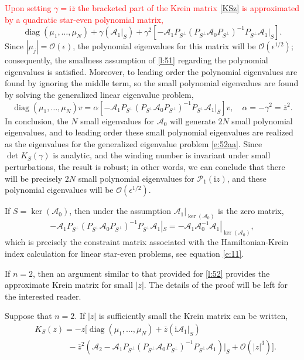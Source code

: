 \documentclass[review,onefignum,onetabnum]{siamart171218}
\def\det{\mathop\mathrm{det}\nolimits}
\def\diag{\mathop\mathrm{diag}\nolimits}
\def\ker{\mathop\mathrm{ker}\nolimits}
\newcommand{\rmi}{\mathrm{i}}
\newcommand{\calA}{\mathcal{A}}
\newcommand{\calO}{\mathcal{O}}
\newcommand{\calP}{\mathcal{P}}
\newcommand{\vK}{\bm{\mathit{K}}}
\newcommand{\vv}{\bm{\mathit{v}}}
\newcommand{\revised}[1]{ \textcolor{red}{#1} }
\begin{document}
\revised{
Upon setting $\gamma=\rmi\overline{z}$ the bracketed part of the Krein matrix \cref{KSz} is approximated by a quadratic star-even polynomial matrix,
}
\[
\diag(\mu_1,\dots,\mu_N)+\gamma\left(\calA_1|_S\right)+
\gamma^2
\left[-\calA_1P_{S^\perp}\left(P_{S^\perp}\calA_0P_{S^\perp}\right)^{-1}P_{S^\perp}\calA_1|_S\right].
\]
Since $|\mu_j|=\calO(\epsilon)$, the polynomial eigenvalues for this matrix will be $\calO(\epsilon^{1/2})$; consequently, the smallness assumption of \cref{l:51} regarding the polynomial eigenvalues is satisfied. Moreover, to leading order the polynomial eigenvalues are found by ignoring the middle term, so the small polynomial eigenvalues are found by solving the generalized linear eigenvalue problem,
\begin{equation}\label{e:52aa}
\diag(\mu_1,\dots,\mu_N)\vv=\alpha
\left[-\calA_1P_{S^\perp}\left(P_{S^\perp}\calA_0P_{S^\perp}\right)^{-1}P_{S^\perp}\calA_1|_S\right]\vv,\quad
\alpha=-\gamma^2=\overline{z}^2.
\end{equation}
In conclusion, the $N$ small eigenvalues for $\calA_0$ will generate $2N$ small polynomial eigenvalues, and to leading order these small polynomial eigenvalues are realized as the eigenvalues for the generalized eigenvalue problem \cref{e:52aa}. Since $\det\vK_S(\gamma)$ is analytic, and the winding number is invariant under small perturbations, the result is robust; in other words, we can conclude that there will be precisely $2N$ small polynomial eigenvalues for $\calP_1(\rmi z)$, and these polynomial eigenvalues will be $\calO(\epsilon^{1/2})$.

\begin{remark}
If $S=\ker(\calA_0)$, then under the assumption $\calA_1|_{\ker(\calA_0)}$ is the zero matrix,
\[
-\calA_1P_{S^\perp}\left(P_{S^\perp}\calA_0P_{S^\perp}\right)^{-1}P_{S^\perp}\calA_1|_S=
-\calA_1\calA_0^{-1}\calA_1|_{\ker(\calA_0)},
\]
which is precisely the constraint matrix associated with the Hamiltonian-Krein index calculation for linear star-even problems, see equation \cref{e:11}.
\end{remark}

If $n=2$, then an argument similar to that provided for \cref{l:52} provides the approximate Krein matrix for small $|z|$.  The details of the proof will be left for the interested reader.

\begin{lemma}\label{l:53}
Suppose that $n=2$. If $|z|$ is sufficiently small the Krein matrix can be written,
\[
\begin{aligned}
&\vK_S(z)=-z\Big[\diag(\mu_1,\dots,\mu_N)+\overline{z}\left(\rmi\calA_1|_S\right)\\
&\qquad\qquad
-\overline{z}^2\left(\calA_2-
\calA_1P_{S^\perp}\left(P_{S^\perp}\calA_0P_{S^\perp}\right)^{-1}P_{S^\perp}\calA_1\right)|_S
+\calO(|z|^3)\Big].
\end{aligned}
\]
\end{lemma}
\end{document}
